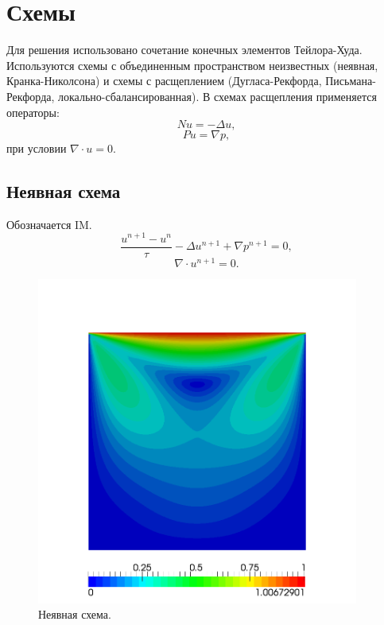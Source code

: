 \documentclass[12pt]{article}
\begin{document}
\section{Схемы}
Для решения использовано сочетание конечных элементов Тейлора-Худа.
Используются схемы с объединенным пространством неизвестных (неявная, Кранка-Николсона) и схемы с расщеплением (Дугласа-Рекфорда, Письмана-Рекфорда, локально-сбалансированная).
В схемах расщепления применяется операторы:
\begin{equation}
Nu = -\Delta u,
\end{equation}
\begin{equation}
Pu = \nabla p, 
\end{equation}
при условии $\nabla\cdot u = 0$.

\subsection{Неявная схема}
Обозначается IM.
\begin{equation}
\frac{u^{n+1}-u^n}{\tau} - \Delta u^{n+1}+\nabla p^{n+1}=0,
\end{equation}
\begin{equation}
\nabla \cdot u^{n+1}=0.
\end{equation}
\begin{figure}
	\begin{center}
		\includegraphics[width=400px]{pics/implicit}
		\caption{Неявная схема.}
		\label{fg:velocity-implicit}
	\end{center}
\end{figure}
\end{document}
